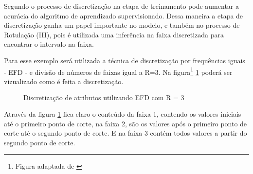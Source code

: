 Segundo \cite{Catlett2006, Hwang2002} o processo de discretização na etapa de treinamento pode aumentar a acurácia do algoritmo de aprendizado supervisionado. Dessa maneira a etapa de discretização ganha um papel importante no modelo, e também no processo de Rotulação (III), pois é utilizada uma inferência na faixa discretizada para encontrar o intervalo na faixa.

Para esse exemplo será utilizada a técnica de discretização por frequências iguais - EFD - e divisão de números de faixas igual a R=3. Na figura\footnote{Figura adaptada de \cite{Lopes}} \ref{fig:EFD_R_3} poderá ser vizualizado como é feita a discretização.
 \begin{figure}[h!]
    \centering
    
    
    
    \caption{Discretização de atributos utilizando EFD com R = 3} \label{fig:EFD_R_3}
        
\end{figure}
Através da figura \ref{fig:EFD_R_3} fica claro o conteúdo da faixa 1, contendo os valores iniciais até o primeiro ponto de corte, na faixa 2, são os valores após o primeiro ponto de corte até o segundo ponto de corte. E na faixa 3 contém todos  valores a partir do segundo ponto de corte.


